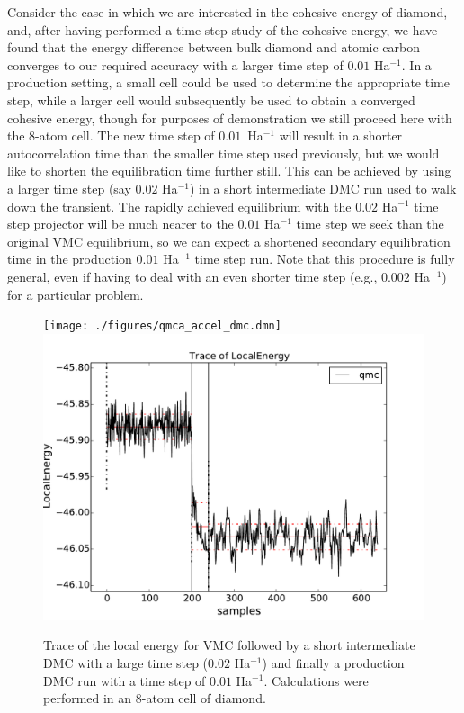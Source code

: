 Consider the case in which we are interested in the cohesive energy of 
diamond, and, after having performed a time step study of the cohesive 
energy, we have found that the energy difference between bulk diamond 
and atomic carbon converges to our required accuracy with a larger 
time step of $0.01$ Ha$^{-1}$.  In a production setting, a small cell 
could be used to determine  the appropriate time step, while a larger 
cell would subsequently be used to obtain a converged cohesive energy, 
though for purposes of demonstration we still proceed here with the 8-atom 
cell.  The new time step of $0.01$~Ha$^{-1}$ will result in a shorter 
autocorrelation time than the smaller time step used previously, but 
we would like to shorten the equilibration time further still.  This 
can be achieved by using a larger time step (say $0.02$ Ha$^{-1}$) in a 
short intermediate DMC run used to walk down the transient.  The 
rapidly achieved equilibrium with the $0.02$ Ha$^{-1}$ time step 
projector will be much nearer to the $0.01$ Ha$^{-1}$ time step 
we seek than the original VMC equilibrium, so we can expect 
a shortened secondary equilibration time in the production 
$0.01$ Ha$^{-1}$ time step run. Note that this procedure is fully 
general, even if having to deal with an even shorter 
time step (e.g., $0.002$ Ha$^{-1}$) for a particular problem.

\begin{figure}
\begin{center}
\ifdefined\HCode  
\texttt{[image: ./figures/qmca\_accel\_dmc.dmn]}
\else
\includegraphics[trim = 0mm 0mm 0mm 0mm, clip,width=0.75\columnwidth]{./figures/qmca_accel_dmc.pdf}
\fi
\end{center}
\caption{Trace of the local energy for VMC followed by a short intermediate DMC with a large time step ($0.02$ Ha$^{-1}$) and finally a production DMC run with a time step of $0.01$ Ha$^{-1}$.  Calculations were performed in an 8-atom cell of diamond.} 
\label{fig:qmca_accel_dmc}
\end{figure}

